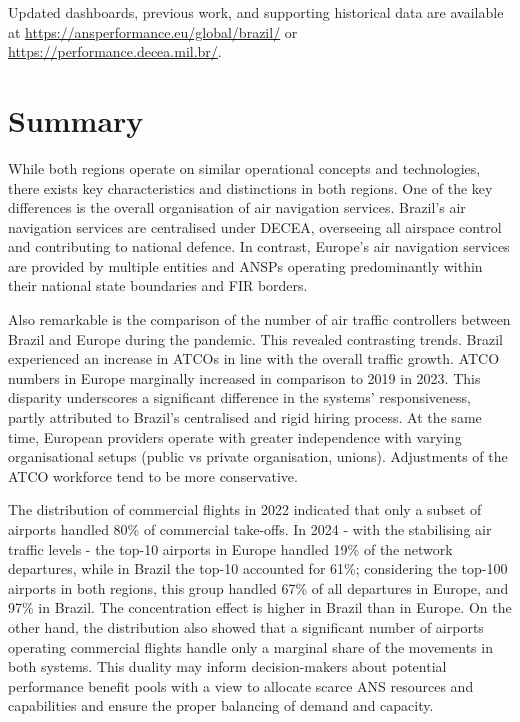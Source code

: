 \documentclass[
  a4paper,
  DIV=11,
  numbers=noendperiod]{scrreport}
\begin{document}
Updated dashboards, previous work, and supporting historical data are
available at \url{https://ansperformance.eu/global/brazil/} or
\url{https://performance.decea.mil.br/}.

\section{Summary}\label{summary}

While both regions operate on similar operational concepts and
technologies, there exists key characteristics and distinctions in both
regions. One of the key differences is the overall organisation of air
navigation services. Brazil's air navigation services are centralised
under DECEA, overseeing all airspace control and contributing to
national defence. In contrast, Europe's air navigation services are
provided by multiple entities and ANSPs operating predominantly within
their national state boundaries and FIR borders.

Also remarkable is the comparison of the number of air traffic
controllers between Brazil and Europe during the pandemic. This revealed
contrasting trends. Brazil experienced an increase in ATCOs in line with
the overall traffic growth. ATCO numbers in Europe marginally increased
in comparison to 2019 in 2023. This disparity underscores a significant
difference in the systems' responsiveness, partly attributed to Brazil's
centralised and rigid hiring process. At the same time, European
providers operate with greater independence with varying organisational
setups (public vs private organisation, unions). Adjustments of the ATCO
workforce tend to be more conservative.

The distribution of commercial flights in 2022 indicated that only a
subset of airports handled 80\% of commercial take-offs. In 2024 - with
the stabilising air traffic levels - the top-10 airports in Europe
handled 19\% of the network departures, while in Brazil the top-10
accounted for 61\%; considering the top-100 airports in both regions,
this group handled 67\% of all departures in Europe, and 97\% in Brazil.
The concentration effect is higher in Brazil than in Europe. On the
other hand, the distribution also showed that a significant number of
airports operating commercial flights handle only a marginal share of
the movements in both systems. This duality may inform decision-makers
about potential performance benefit pools with a view to allocate scarce
ANS resources and capabilities and ensure the proper balancing of demand
and capacity.
\end{document}

